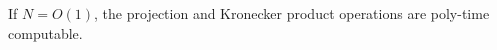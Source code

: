 








 
\begin{proposition}\label{prop:efficentoperations}
If $N=O(1)$, the projection and Kronecker product operations are poly-time computable.
\end{proposition}

\begin{comment}
 The proof can be found in the appendix. The running time complexity of the projection  (resp. the Kronecker product) operation is equal to $O\left(|\Sigma_{i}|^{N} \cdot \texttt{size}(A) \cdot \texttt{size}(T)\right)$ (resp. $O\left((\max\limits_{i \in [N]} 
 |\Sigma_{i}|)^{N} \cdot \texttt{size}(A) \cdot \texttt{size}(B) \right)$. The size of their output N-Alphabet WAs is equal to the product of the size of their respective input N-Alphabet WAs.
\end{comment}

